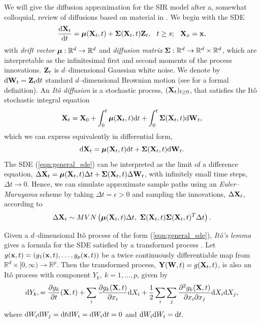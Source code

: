 We will give the diffusion approximation for the SIR model after a, somewhat colloquial, review of diffusions based on material in \cite{fuchs2013inference,oksendal2003stochastic,schnoerr2017approximation,wilkinson2011stochastic}. We begin with the SDE \begin{equation}
\frac{\mathrm{d}\mathbf{X}_t}{\mathrm{d} t} = \boldsymbol{\mu}(\mathbf{X}_t,t) + \boldsymbol{\Sigma}(\mathbf{X}_t,t)\mathbf{Z}_t,\hspace{0.1in} t\geq s;\hspace{0.1in} \mathbf{X}_x = \mathbf{x},\end{equation}
with \textit{drift vector} $ \boldsymbol{\mu}:\mathbb{R}^d\rightarrow\mathbb{R}^d $ and  \textit{diffusion matrix} $ \boldsymbol{\Sigma}:\mathbb{R}^d\rightarrow \mathbb{R}^d\times\mathbb{R}^d $, which are interpretable as the infinitesimal first and second moments of the process innovations. $ \mathbf{Z}_t $ is $ d $--dimensional Gaussian white noise. We denote by $ \mathrm{d}\mathbf{W}_t = \mathbf{Z}_t\mathrm{d} t$ standard $ d $--dimensional Brownian motion (see \cite{oksendal2003stochastic} for a formal definition). An \textit{It\^{o} diffusion} is a stochastic process, $ (\mathbf{X}_t)_{t\geq0} $, that satisfies the It\^{o} stochastic integral equation
\begin{equation}
\mathbf{X}_t = \mathbf{X}_0 + \int_0^t\boldsymbol{\mu}(\mathbf{X}_t,t)\mathrm{d} t + \int_0^t\boldsymbol{\Sigma}(\mathbf{X}_t,t)\mathrm{d}\mathbf{W}_t,\end{equation}
which we can express equivalently in differential form,
\begin{equation}
\label{eqn:general_sde}
\mathrm{d}\mathbf{X}_t = \boldsymbol{\mu}(\mathbf{X}_t,t)\mathrm{d} t + \boldsymbol{\Sigma}(\mathbf{X}_t,t)\mathrm{d}\mathbf{W}_t.
\end{equation}
The SDE (\ref{eqn:general_sde}) can be interpreted as the limit of a difference equation, $ \Delta\mathbf{X}_t = \boldsymbol{\mu}(\mathbf{X}_t,t)\Delta t + \boldsymbol{\Sigma}(\mathbf{X}_t,t)\Delta\mathbf{W}_t $, with infinitely small time steps, $ \Delta t \rightarrow 0$. Hence, we can simulate approximate sample paths using an \textit{Euler--Maruyama} scheme by taking $ \Delta t = \epsilon>0 $ and sampling the innovations, $ \Delta\mathbf{X}_t$, according to
$$\Delta\bX_t\sim MVN\left (\bmu(\bX_t,t)\Delta t,\ \bSigma(\bX_t,t)\bSigma(\bX_t,t)^T\Delta t\right ).$$

Given a $ d $--dimensional It\^{o} process of the form (\ref{eqn:general_sde}), \textit{It\^{o}'s lemma} gives a formula for the SDE satisfied by a transformed process \cite{oksendal2003stochastic}. Let $ g(\mathbf{x}, t) = \left (g_1(\mathbf{x},t),\dots,g_p(\mathbf{x},t)\right ) $ be a twice continuously differentiable map from $ \mathbb{R}^d\times[0,\infty)\rightarrow\mathbb{R}^p $. Then the transformed process, $ \mathbf{Y}(\mathbf{W},t) = g(\mathbf{X}_t, t)$, is also an It\^{o} process with component $ Y_k,\ k=1,\dots,p $, given by
$$\mathrm{d} Y_k, = \frac{\partial g_k}{\partial t}(\mathbf{X}, t) + \sum_i\frac{\partial g_k(\mathbf{X},t)}{\partial x_i}\mathrm{d} X_i + \frac{1}{2}\sum_i\sum_j\frac{\partial^2g_k(\mathbf{X},t)}{\partial x_i\partial x_j}\mathrm{d} X_i\mathrm{d} X_j,$$
where $ \mathrm{d} W_i\mathrm{d} W_j = \mathrm{d} t\mathrm{d} W_i = \mathrm{d} W_i\mathrm{d} t = 0 $ and $ \mathrm{d} W_i\mathrm{d} W_i = \mathrm{d} t. $

